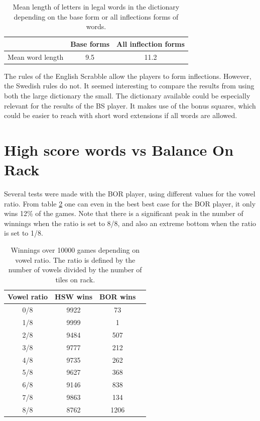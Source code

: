 \documentclass[a4paper, 12pt]{report}
\begin{document}
\begin{table}[h]
\centering
	\begin{tabular}{l | c | c}
	& Base forms & All inflection forms \\
	\hline
	Mean word length & 9.5 & 11.2 \\
	\end{tabular}
\caption{Mean length of letters in legal words in the dictionary depending on the base form or all inflections forms of words.}
\label{table:dictionary+length}
\end{table}


The rules of the English Scrabble allow the players to form inflections. However, the Swedish rules do not. It seemed interesting to compare the results from using both the large dictionary the small. The dictionary available could be especially relevant for the results of the BS player. It makes use of the bonus squares, which could be easier to reach with short word extensions if all words are allowed.



\section{High score words vs Balance On Rack}
\label{sec:highBalance}

Several tests were made with the BOR player, using different values for the vowel ratio. From table \ref{tab:bor+hsw} one can even in the best best case for the BOR player, it only wins 12\% of the games. Note that there is a significant peak in the number of winnings when the ratio is set to 8/8, and also an extreme bottom when the ratio is set to 1/8.


\begin{table}[h]
\centering
    \begin{tabular}{ c | c | c p{5cm}}
   	Vowel ratio & HSW wins & BOR wins \\ \hline
	0/8 & 9922 & 73 \\ 
    	1/8 & 9999  & 1 \\ 
    	2/8 & 9484 & 507 \\
    	3/8 & 9777 & 212 \\
	4/8 & 9735 & 262 \\ 
	5/8 & 9627 & 368 \\ 
	6/8 & 9146 & 838 \\ 
	7/8 & 9863 & 134 \\ 
	8/8 & 8762 & 1206 \\
    \end{tabular}
\caption{Winnings over 10000 games depending on vowel ratio. The ratio is defined by the number of vowels divided by the number of tiles on rack.}
\label{tab:bor+hsw}
\end{table}
\end{document}

